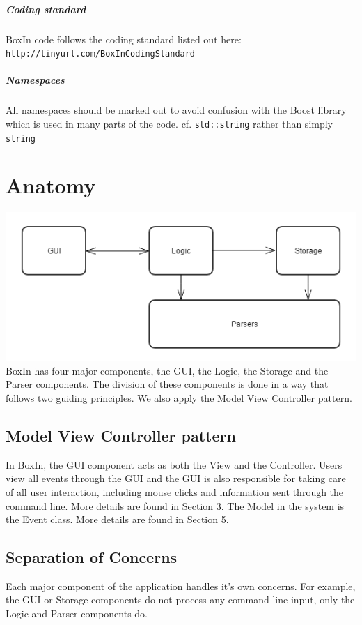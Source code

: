 \documentclass[12pt]{extarticle}
\begin{document}
\subparagraph{Coding standard}
BoxIn code follows the coding standard listed out here:\\ \texttt{http://tinyurl.com/BoxInCodingStandard}

\subparagraph{Namespaces}
All namespaces should be marked out to avoid confusion with the Boost library which is used in many parts of the code. cf. \texttt{std::string} rather than simply \texttt{string}\\

\section{Anatomy}

\includegraphics[width=\textwidth]{architecture}\\

BoxIn has four major components, the GUI, the Logic, the Storage and the Parser components. The division of these components is done in a way that follows two guiding principles. We also apply the Model View Controller pattern.

\subsection{Model View Controller pattern}
In BoxIn, the GUI component acts as both the View and the Controller. Users view all events through the GUI and the GUI is also responsible for taking care of all user interaction, including mouse clicks and information sent through the command line. More details are found in Section 3.
The Model in the system is the Event class. More details are found in Section 5.

\subsection{Separation of Concerns}
Each major component of the application handles it's own concerns. For example, the GUI or Storage components do not process any command line input, only the Logic and Parser components do.
\end{document}
